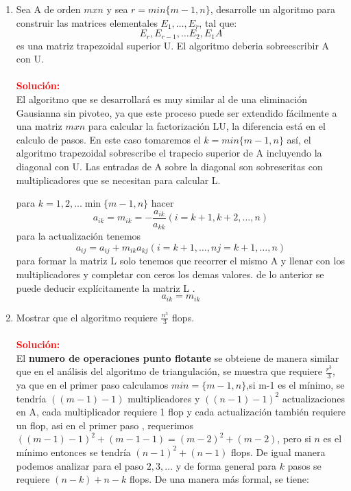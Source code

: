 \begin{enumerate}[label=(\alph*)]
    \item Sea A de orden $mxn$ y sea $r = min\{ m-1,n\}$, desarrolle un algoritmo para construir las matrices elementales $E_1,\dots ,E_r$, tal que:
    \[
	E_r, E_{r-1}, \dots E_2, E_1 A
    \]
    es una matriz trapezoidal superior U. El algoritmo deberia sobreescribir A con U.
    \\\\
    \noindent \textcolor{red}{\bf Solución:}\\    
    El algoritmo que se desarrollará es muy similar al de una eliminación Gausianna sin pivoteo, ya que este proceso puede ser extendido fácilmente a una matriz $mxn$ para calcular la factorización LU, la diferencia está en el calculo de pasos. En este caso tomaremos el $k = min\{m-1,n\}$ así, el algoritmo trapezoidal sobrescribe el trapecio superior de A incluyendo la diagonal con U. Las entradas de A sobre la diagonal son sobrescritas con multiplicadores que se necesitan para calcular L.
	
	para $k = 1,2, ...\min\{m-1, n\}$ hacer
	\[
		a_{ik} = m_{ik} = -\frac{a_{ik}}{a_{kk}}(i = k+1,k+2,\dots ,n)
	\]
	para la actualización tenemos 
	\[
		a_{ij} = a_{ij} + m_{ik} a_{kj}(i = k+1,\dots, n  j = k+1,\dots, n)
	\]		
	para formar la matriz L solo tenemos que recorrer el mismo A y llenar con los multiplicadores y completar con ceros los demas valores. de lo anterior se puede deducir explícitamente la matriz L .
	\[
		a_{ik} = m_{ik}
	\]
	
	\item Mostrar que el algoritmo requiere $\frac{n^3}{3}$ flops.\\\\
	\noindent \textcolor{red}{\bf Solución:}\\    
	El \textbf{numero de operaciones punto flotante} se obteiene de manera similar que en el análisis del algoritmo de triangulación, se muestra que requiere $\frac{r^3}{3}$, ya que en el primer paso calculamos $min=\{m-1,n\}$,si m-1 es el mínimo, se tendría $((m-1)-1)$ multiplicadores  y $((n-1)-1)^2$ actualizaciones  en A, cada multiplicador requiere 1 flop y cada actualización también requiere un flop, asi en el primer paso , requerimos $((m-1)-1)^2+(m-1-1) =(m-2)^2+(m-2)$, pero si $n$ es el mínimo entonces se tendría $(n-1)^2+(n-1)$ flops.
	De igual manera podemos analizar para el paso $2,3, \dots$ y de forma general para $k$ pasos se requiere $(n-k)+ n-k$ flops. De una manera más formal, se tiene:
	

\end{enumerate}

